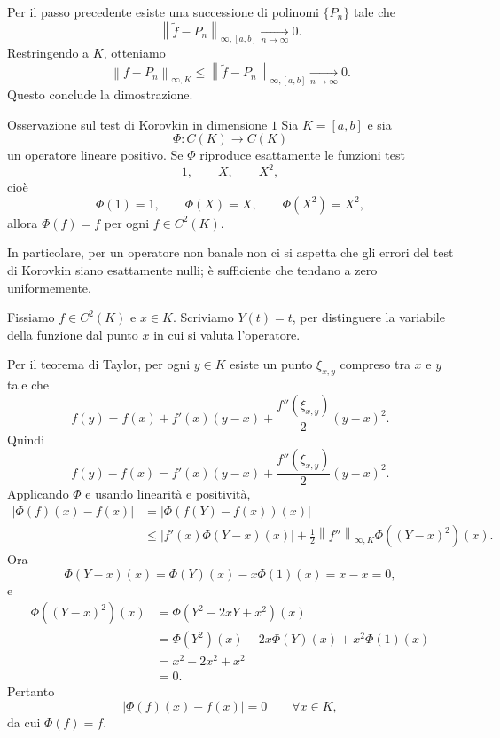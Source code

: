 \documentclass[a4paper]{article}
\begin{document}
\begin{snippetproof}{}
    Per il passo precedente esiste una successione di polinomi \(\{P_n\}\) tale che
    \[
        \left\|\widetilde f-P_n\right\|_{\infty,[a,b]}
        \xrightarrow[n\to\infty]{}
        0.
    \]
    Restringendo a \(K\), otteniamo
    \[
        \left\|f-P_n\right\|_{\infty,K}
        \leq
        \left\|\widetilde f-P_n\right\|_{\infty,[a,b]}
        \xrightarrow[n\to\infty]{}
        0.
    \]
    Questo conclude la dimostrazione.
\end{snippetproof}

\begin{snippetproposition}{Osservazione sul test di Korovkin in dimensione \(1\)}
    Sia \(K=[a,b]\) e sia
    \[
        \Phi:C(K)\longrightarrow C(K)
    \]
    un operatore lineare positivo. Se \(\Phi\) riproduce esattamente le funzioni test
    \[
        1,\qquad X,\qquad X^2,
    \]
    cioè
    \[
        \Phi(1)=1,
        \qquad
        \Phi(X)=X,
        \qquad
        \Phi(X^2)=X^2,
    \]
    allora \(\Phi(f)=f\) per ogni \(f\in C^2(K)\).

    In particolare, per un operatore non banale non ci si aspetta che gli errori del test di Korovkin siano esattamente nulli; è sufficiente che tendano a zero uniformemente.
\end{snippetproposition}

\begin{snippetproof}{}
    Fissiamo \(f\in C^2(K)\) e \(x\in K\). Scriviamo \(Y(t)=t\), per distinguere la variabile della funzione dal punto \(x\) in cui si valuta l'operatore.

    Per il teorema di Taylor, per ogni \(y\in K\) esiste un punto \(\xi_{x,y}\) compreso tra \(x\) e \(y\) tale che
    \[
        f(y)
        =
        f(x)
        +
        f'(x)(y-x)
        +
        \frac{f''(\xi_{x,y})}{2}(y-x)^2.
    \]
    Quindi
    \[
        f(y)-f(x)
        =
        f'(x)(y-x)
        +
        \frac{f''(\xi_{x,y})}{2}(y-x)^2.
    \]
    Applicando \(\Phi\) e usando linearità e positività,
    \begin{align*}
        \left|
        \Phi(f)(x)-f(x)
        \right|
        &=
        \left|
        \Phi(f(Y)-f(x))(x)
        \right| \\
        &\leq
        \left|
        f'(x)\Phi(Y-x)(x)
        \right|
        +
        \frac{1}{2}\left\|f''\right\|_{\infty,K}
        \Phi((Y-x)^2)(x).
    \end{align*}
    Ora
    \[
        \Phi(Y-x)(x)
        =
        \Phi(Y)(x)-x\Phi(1)(x)
        =
        x-x
        =
        0,
    \]
    e
    \begin{align*}
        \Phi((Y-x)^2)(x)
        &=
        \Phi(Y^2-2xY+x^2)(x) \\
        &=
        \Phi(Y^2)(x)-2x\Phi(Y)(x)+x^2\Phi(1)(x) \\
        &=
        x^2-2x^2+x^2 \\
        &=
        0.
    \end{align*}
    Pertanto
    \[
        \left|
        \Phi(f)(x)-f(x)
        \right|
        =0
        \qquad
        \forall x\in K,
    \]
    da cui \(\Phi(f)=f\).
\end{snippetproof}
\end{document}

